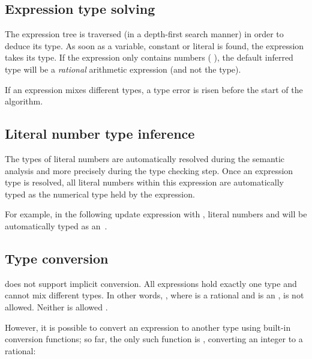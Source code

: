 \subsection{Expression type solving}

The expression tree is traversed (in a depth-first search manner) in order to deduce its type.
As soon as a variable, constant or literal is found, the expression takes its type.
If the expression only contains numbers (\eg{} ), the default inferred type will be a \emph{rational} arithmetic expression (and not the  type).

If an expression mixes different types, a type error is risen before the start of the algorithm.


\subsection{Literal number type inference}

The types of literal numbers are automatically resolved during the semantic analysis and more precisely during the type checking step.
Once an expression type is resolved, all literal numbers within this expression are automatically typed as the numerical type held by the expression.

For example, in the following update expression  with , literal numbers  and  will be automatically typed as an~.

\subsection{Type conversion}

\imitator{} does not support implicit conversion.
All expressions hold exactly one type and cannot mix different types.
In other words, , where  is a rational and  is an , is not allowed.
Neither is allowed .

However, it is possible to convert an expression to another type using built-in conversion functions;
so far, the only such function is , converting an integer to a rational:

